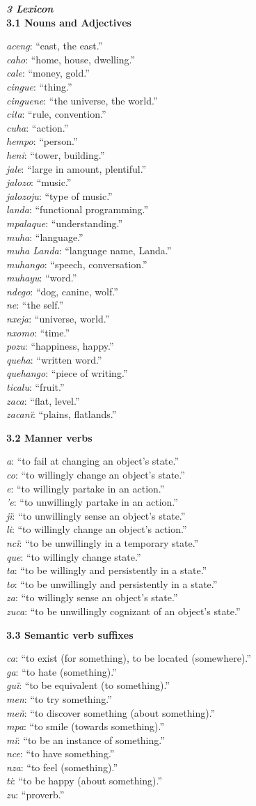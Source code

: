 \documentclass{article}[10pt]
\newcommand{\define}[2]{\emph{#1}: ``#2.'' \\}
\begin{document}
\clearpage
{\bf \emph{3 Lexicon}}\\

{\bf 3.1 Nouns and Adjectives}
\begin{multicols}{3}
\noindent
\define{aceng}{east, the east}
\define{caho}{home, house, dwelling}
\define{cale}{money, gold}
\define{cingue}{thing}
\define{cinguene}{the universe, the world}
\define{cita}{rule, convention}
\define{cuha}{action}
\define{hempo}{person}
\define{heni}{tower, building}
\define{jale}{large in amount, plentiful}
\define{jalozo}{music}
\define{jalozoju}{type of music}
\define{landa}{functional programming}
\define{mpalaque}{understanding}
\define{muha}{language}
\define{muha Landa}{language name, Landa}
\define{muhango}{speech, conversation}
\define{muhayu}{word}
\define{ndego}{dog, canine, wolf}
\define{ne}{the self}
\define{nxeja}{universe, world}
\define{nxomo}{time}
\define{pozu}{happiness, happy}
\define{queha}{written word}
\define{quehango}{piece of writing}
\define{ticalu}{fruit}
\define{zaca}{flat, level}
\define{zacan\"{i}}{plains, flatlands}
\end{multicols}

{\bf 3.2 Manner verbs}
\begin{multicols}{3}
\noindent
\define{a}{to fail at changing an object's state}
\define{co}{to willingly change an object's state}
\define{e}{to willingly partake in an action}
\define{'e}{to unwillingly partake in an action}
\define{j\"{i}}{to unwillingly sense an object's state}
\define{li}{to willingly change an object's action}
\define{nc\"{i}}{to be unwillingly in a temporary state}
\define{que}{to willingly change state}
\define{ta}{to be willingly and persistently in a state}
\define{to}{to be unwillingly and persistently in a state}
\define{za}{to willingly sense an object's state}
\define{zuca}{to be unwillingly cognizant of an object's state}
\end{multicols}

{\bf 3.3 Semantic verb suffixes}
\begin{multicols}{3}
\noindent
\define{ca}{to exist (for something), to be located (somewhere)}
\define{ga}{to hate (something)}
\define{gu\"{i}}{to be equivalent (to something)}
\define{men}{to try something}
\define{me\~{n}}{to discover something (about something)}
\define{mpa}{to smile (towards something)}
\define{m\"{i}}{to be an instance of something}
\define{nce}{to have something}
\define{nza}{to feel (something)}
\define{ti}{to be happy (about something)}
\define{zu}{proverb}
\end{multicols}
\end{document}
